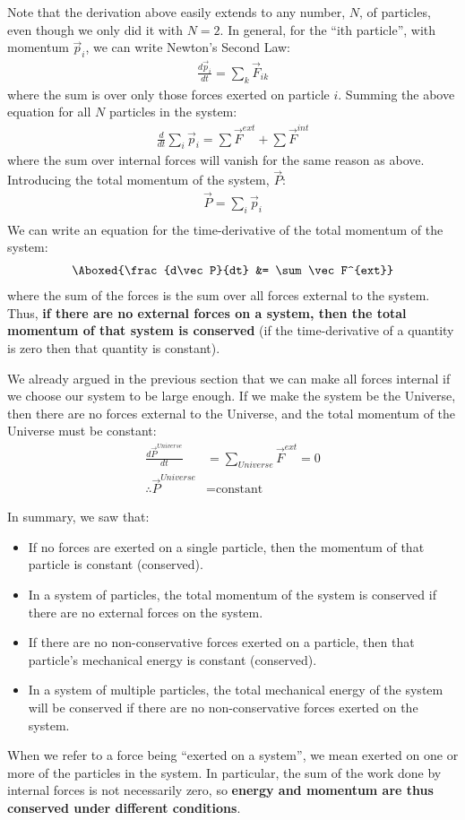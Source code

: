 Note that the derivation above easily extends to any number, $N$, of particles, even though we only did it with $N=2$. In general, for the ``ith particle'', with momentum $\vec p_i$, we can write Newton's Second Law:
\begin{align*}
\frac{d\vec p_i}{dt}=\sum_k \vec F_{ik}
\end{align*} 
where the sum is over only those forces exerted on particle $i$. Summing the above equation for all $N$ particles in the system:
\begin{align*}
\frac{d}{dt}\sum_i \vec p_i=\sum \vec F^{ext} + \sum \vec F^{int}
\end{align*}
where the sum over internal forces will vanish for the same reason as above. Introducing the total momentum of the system, $\vec P$:
\begin{align*}
\vec P = \sum_i \vec p_i\\
\end{align*}
We can write an equation for the time-derivative of the total momentum of the system:
\begin{align}
\Aboxed{\frac{d\vec P}{dt} &= \sum \vec F^{ext}}
\end{align}
where the sum of the forces is the sum over all forces external to the system. Thus, \textbf{if there are no external forces on a system, then the total momentum of that system is conserved} (if the time-derivative of a quantity is zero then that quantity is constant).

We already argued in the previous section that we can make all forces internal if we choose our system to be large enough. If we make the system be the Universe, then there are no forces external to the Universe, and the total momentum of the Universe must be constant:
\begin{align*}
\frac{d\vec P^{Universe}}{dt} &= \sum_{Universe} \vec F^{ext} = 0 \\
\therefore \vec P^{Universe}&=\text{constant}
\end{align*}

In summary, we saw that:
\begin{itemize}
\item If no forces are exerted on a single particle, then the momentum of that particle is constant (conserved).
\item In a system of particles, the total momentum of the system is conserved if there are no external forces on the system.
\item If there are no non-conservative forces exerted on a particle, then that particle's mechanical energy is constant (conserved).
\item In a system of multiple particles, the total mechanical energy of the system will be conserved if there are no non-conservative forces exerted on the system.
\end{itemize} 
When we refer to a force being ``exerted on a system'', we mean exerted on one or more of the particles in the system. In particular, the sum of the work done by internal forces is not necessarily zero, so \textbf{energy and momentum are thus conserved under different conditions}.

